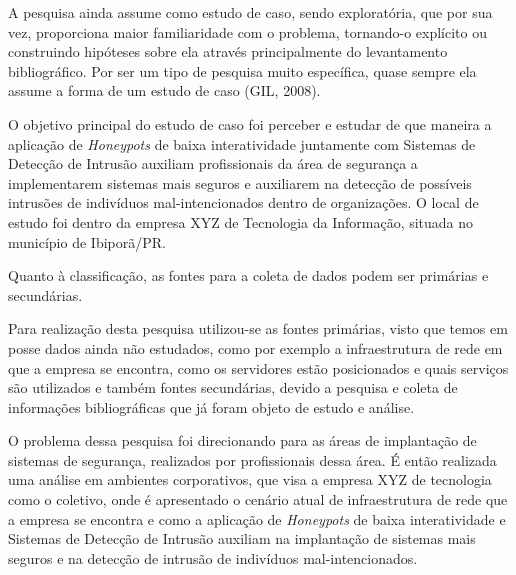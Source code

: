 A pesquisa ainda assume como estudo de caso, sendo exploratória, que por sua vez, proporciona maior familiaridade com o problema, tornando-o explícito ou construindo hipóteses sobre ela através principalmente do levantamento bibliográfico. Por ser um tipo de pesquisa muito específica, quase sempre ela assume a forma de um estudo de caso (GIL, 2008).

O objetivo principal do estudo de caso foi perceber e estudar de que maneira a aplicação de \textit{Honeypots} de baixa interatividade juntamente com Sistemas de Detecção de Intrusão auxiliam profissionais da área de segurança a implementarem sistemas mais seguros e auxiliarem na detecção de possíveis intrusões de indivíduos mal-intencionados dentro de organizações. O local de estudo foi dentro da empresa XYZ de Tecnologia da Informação, situada no município de Ibiporã/PR.

Quanto à classificação, as fontes para a coleta de dados podem ser primárias e secundárias. 

Para realização desta pesquisa utilizou-se as fontes primárias, visto que temos em posse dados ainda não estudados, como por exemplo a infraestrutura de rede em que a empresa se encontra, como os servidores estão posicionados e quais serviços são utilizados e também fontes secundárias, devido a pesquisa e coleta de informações bibliográficas que já foram objeto de estudo e análise.

O problema dessa pesquisa foi direcionando para as áreas de implantação de sistemas de segurança, realizados por profissionais dessa área. É então realizada uma análise em ambientes corporativos, que visa a empresa XYZ de tecnologia como o coletivo, onde é apresentado o cenário atual de infraestrutura de rede que a empresa se encontra e como a aplicação de \textit{Honeypots} de baixa interatividade e Sistemas de Detecção de Intrusão auxiliam na implantação de sistemas mais seguros e na detecção de intrusão de indivíduos mal-intencionados.